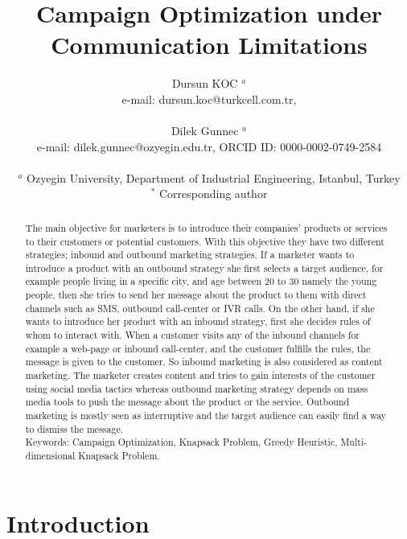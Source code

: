 \documentclass[11pt]{article}
\title{Campaign Optimization under Communication Limitations \\}
\author{Dursun KOC $^{a}$ \\ 
	e-mail: dursun.koc@turkcell.com.tr, \\\\
	Dilek Gunnec $^{a}$ \\ 
	e-mail: dilek.gunnec@ozyegin.edu.tr, ORCID ID: 0000-0002-0749-2584 \\\\
$^{a}$ Ozyegin University, Department of Industrial Engineering, Istanbul, Turkey \\ 
$^{\ast}$ Corresponding author \\ }
\date{}
\begin{document}
\maketitle
\begin{abstract}
The main objective for marketers is to introduce their companies’ products or services to their customers or potential customers. With this objective they have two different strategies; inbound and outbound marketing strategies. If a marketer wants to introduce a product with an outbound strategy she first selects a target audience, for example people living in a specific city, and age between 20 to 30 namely the young people, then she tries to send her message about the product to them with direct channels such as SMS, outbound call-center or IVR calls. On the other hand, if she wants to introduce her product with an inbound strategy, first she decides rules of whom to interact with. When a customer visits any of the inbound channels for example a web-page or inbound call-center, and the customer fulfills the rules, the message is given to the customer. So inbound marketing is also considered as content marketing. The marketer creates content and tries to gain interests of the customer using social media tactics whereas outbound marketing strategy depends on mass media tools to push the message about the product or the service. Outbound marketing is mostly seen as interruptive and the target audience can easily find a way to dismiss the message. \\

Keywords: Campaign Optimization, Knapsack Problem, Greedy Heuristic, Multi-dimensional Knapsack Problem.

\end{abstract}


\newpage

\section{Introduction}
\end{document}
